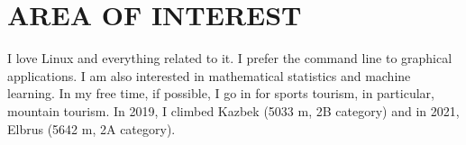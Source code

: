 \section{AREA OF INTEREST}

    I love Linux and everything related to it. I prefer the command line to graphical applications.
    I am also interested in mathematical statistics and machine learning.
    In my free time, if possible, I go in for sports tourism, in particular, mountain tourism. In 2019,
    I climbed Kazbek (5033 m, 2B category) and in 2021, Elbrus (5642 m, 2A category).

